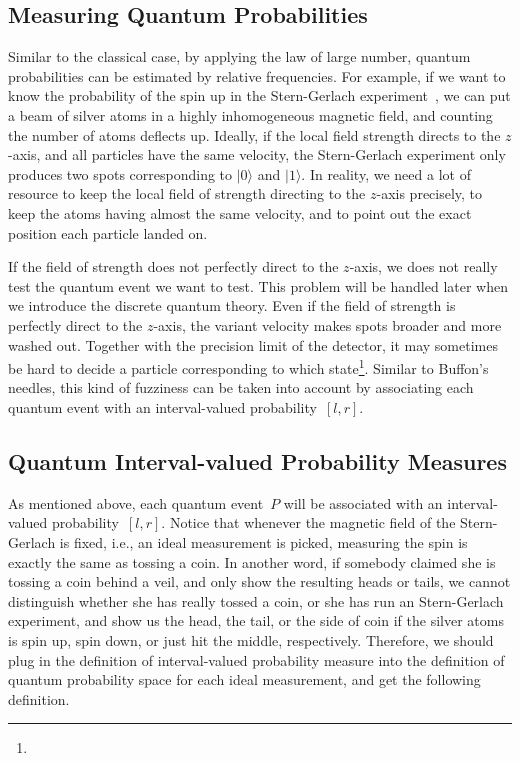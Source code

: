 \documentclass{article}
\theoremstyle{remark}
\newcommand{\ket}[1]{|#1\rangle}
\newcommand{\yutsung}[1]{\fbox{\begin{minipage}{0.9\textwidth}\color{purple}{Yu-Tsung says: #1}\end{minipage}}}
\newcommand{\amr}[1]{\fbox{\begin{minipage}{0.9\textwidth}\color{green}{Amr says: #1}\end{minipage}}}
\begin{document}
\subsection{Measuring Quantum Probabilities}

Similar to the classical case, by applying the law of large number,
quantum probabilities can be estimated by relative frequencies. For
example, if we want to know the probability of the spin up in the
Stern-Gerlach experiment~\cite{Stern1988,peres1995quantum,544199,Griffiths2003},
we can put a beam of silver atoms in a highly inhomogeneous magnetic
field, and counting the number of atoms deflects up. Ideally, if the
local field strength directs to the $z$-axis, and all particles have
the same velocity, the Stern-Gerlach experiment only produces two
spots corresponding to $\ket{0}$ and $\ket{1}$. In reality, we need
a lot of resource to keep the local field of strength directing to
the $z$-axis precisely, to keep the atoms having almost the same velocity,
and to point out the exact position each particle landed on. 

If the field of strength does not perfectly direct to the $z$-axis,
we does not really test the quantum event we want to test. This problem
will be handled later when we introduce the discrete quantum theory.
Even if the field of strength is perfectly direct to the $z$-axis,
the variant velocity makes spots broader and more washed out. Together
with the precision limit of the detector, it may sometimes be hard
to decide a particle corresponding to which state\footnote{\yutsung{Add citations to support the idea... Haven't found suitable
ones...}}. Similar to Buffon's needles, this kind of fuzziness can be taken
into account by associating each quantum event with an interval-valued
probability~$\left[l,r\right]$. 

\amr{preparation fuzzy, device fuzzy, Meyer~\cite{PhysRevLett.83.3751}}



\subsection{Quantum Interval-valued Probability Measures}

As mentioned above, each quantum event~$P$ will be associated with
an interval-valued probability~$\left[l,r\right]$. Notice that whenever
the magnetic field of the Stern-Gerlach is fixed, i.e., an ideal measurement
is picked, measuring the spin is exactly the same as tossing a coin.
In another word, if somebody claimed she is tossing a coin behind
a veil, and only show the resulting heads or tails, we cannot distinguish
whether she has really tossed a coin, or she has run an Stern-Gerlach
experiment, and show us the head, the tail, or the side of coin if
the silver atoms is spin up, spin down, or just hit the middle, respectively.
Therefore, we should plug in the definition of interval-valued probability
measure into the definition of quantum probability space for each
ideal measurement, and get the following definition.
\end{document}
